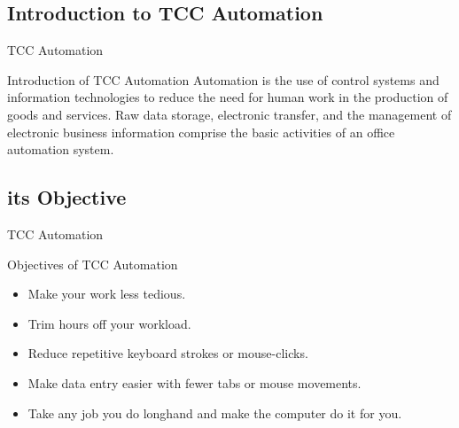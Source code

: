 \subsection{Introduction to TCC Automation}
\begin{frame}{TCC Automation} 
\begin{block}{Introduction of TCC Automation}
Automation is the use of control systems and information technologies to reduce the need for human work in the production of goods and services. Raw data storage, electronic transfer, and the management of electronic business information comprise the basic activities of an office automation system.
\end{block}
\end{frame}
\newpage
\subsection{its Objective}
\begin{frame}{TCC Automation} 
\begin{block}{Objectives of TCC Automation}
\begin{itemize}
\item<2-> Make your work less tedious.
\item<3-> Trim hours off your workload.
\item<4-> Reduce repetitive keyboard strokes or mouse-clicks.
\item<5-> Make data entry easier with fewer tabs or mouse movements.
\item<6-> Take any job you do longhand and make the computer do it for you.
\end{itemize}
\end{block}
\end{frame}
\newpage
